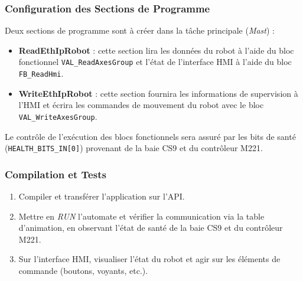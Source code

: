 \subsubsection{Configuration des Sections de Programme}

Deux sections de programme sont à créer dans la tâche principale (\textit{Mast}) :
\begin{itemize}
    \item \textbf{ReadEthIpRobot} : cette section lira les données du robot à l'aide du bloc fonctionnel \texttt{VAL\_ReadAxesGroup} et l'état de l'interface HMI à l'aide du bloc \texttt{FB\_ReadHmi}.
    \item \textbf{WriteEthIpRobot} : cette section fournira les informations de supervision à l'HMI et écrira les commandes de mouvement du robot avec le bloc \texttt{VAL\_WriteAxesGroup}.
\end{itemize}

Le contrôle de l'exécution des blocs fonctionnels sera assuré par les bits de santé (\texttt{HEALTH\_BITS\_IN[0]}) provenant de la baie CS9 et du contrôleur M221.

\subsubsection{Compilation et Tests}

\begin{enumerate}
    \item Compiler et transférer l'application sur l'API.
    \item Mettre en \textit{RUN} l'automate et vérifier la communication via la table d'animation, en observant l'état de santé de la baie CS9 et du contrôleur M221.
    \item Sur l'interface HMI, visualiser l'état du robot et agir sur les éléments de commande (boutons, voyants, etc.).
\end{enumerate}
